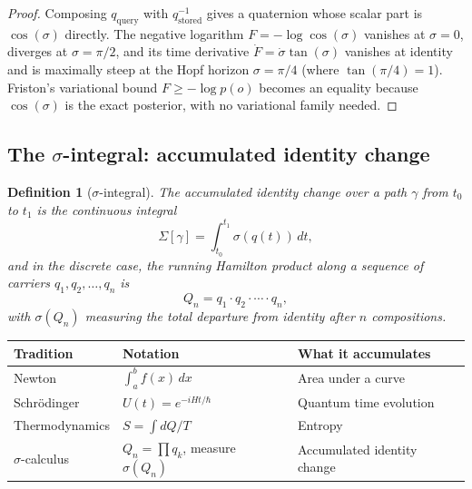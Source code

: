 \documentclass[12pt]{article}
\newtheorem{definition}[theorem]{Definition}
\begin{document}
\begin{proof}
    Composing $q_{\text{query}}$ with $q_{\text{stored}}^{-1}$ gives a quaternion whose scalar part is $\cos(\sigma)$ directly. The negative logarithm $F = -\log\cos(\sigma)$ vanishes at $\sigma = 0$, diverges at $\sigma = \pi/2$, and its time derivative $\dot{F} = \dot{\sigma}\tan(\sigma)$ vanishes at identity and is maximally steep at the Hopf horizon $\sigma = \pi/4$ (where $\tan(\pi/4) = 1$). Friston's variational bound $F \geq -\log p(o)$ becomes an equality because $\cos(\sigma)$ is the exact posterior, with no variational family needed.
\end{proof}

\subsection{The $\sigma$-integral: accumulated identity change}

\begin{definition}[$\sigma$-integral]
    The accumulated identity change over a path $\gamma$ from $t_0$ to $t_1$ is the continuous integral
    \begin{equation}
        \Sigma[\gamma] = \int_{t_0}^{t_1} \sigma(q(t))\, dt,
    \end{equation}
    and in the discrete case, the running Hamilton product along a sequence of carriers $q_1, q_2, \ldots, q_n$ is
    \begin{equation}
        Q_n = q_1 \cdot q_2 \cdot \cdots \cdot q_n,
    \end{equation}
    with $\sigma(Q_n)$ measuring the total departure from identity after $n$ compositions.
\end{definition}

\begin{center}
\begin{tabular}{l l l}
    \toprule
    Tradition & Notation & What it accumulates \\
    \midrule
    Newton & $\int_a^b f(x)\,dx$ & Area under a curve \\[4pt]
    Schr\"odinger & $U(t) = e^{-iHt/\hbar}$ & Quantum time evolution \\[4pt]
    Thermodynamics & $S = \int dQ/T$ & Entropy \\[4pt]
    $\sigma$-calculus & $Q_n = \prod q_k$, measure $\sigma(Q_n)$ & Accumulated identity change \\
    \bottomrule
\end{tabular}
\end{center}
\end{document}
